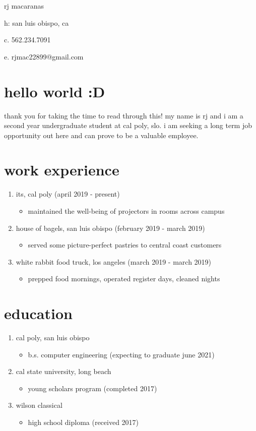 \documentclass[letterpaper, 12pt]{article}
\begin{document}
\addtolength{\topmargin}{-.875in}

rj macaranas

h: san luis obispo, ca 

c. 562.234.7091

e. rjmac22899@gmail.com

\section{hello world :D}
thank you for taking the time to read through this! my name is rj and i am a 
second year undergraduate student at cal poly, slo. i am seeking a long term 
job opportunity out here and can prove to be a valuable employee. 

\section{work experience}
\begin{enumerate}
    \item its, cal poly    (april 2019 - present)
\begin{itemize}
\item maintained the well-being of projectors in rooms across campus 
\end{itemize}
\item house of bagels, san luis obispo (february 2019 - march 2019) 
\begin{itemize}
\item served some picture-perfect pastries to central coast customers
\end{itemize}
\item white rabbit food truck, los angeles (march 2019 - march 2019)
\begin{itemize}
\item prepped food mornings, operated register days, cleaned nights
\end{itemize}
\end{enumerate}

\section{education}
\begin{enumerate}
    \item cal poly, san luis obispo
\begin{itemize}
    \item b.s. computer engineering (expecting to graduate june 2021) 
\end{itemize}
\item cal state university, long beach 
\begin{itemize}
    \item young scholars program (completed 2017) 
\end{itemize}
\item wilson classical 
\begin{itemize}
    \item high school diploma (received 2017) 
\end{itemize}

\end{enumerate}
\end{document}

